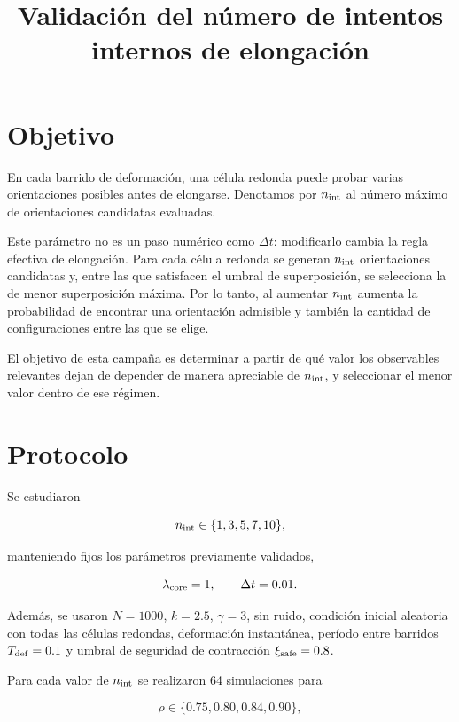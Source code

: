 \documentclass[11pt,a4paper]{article}
\title{Validación del número de intentos internos de elongación}
\author{}
\date{}
\begin{document}
\maketitle

\section{Objetivo}

En cada barrido de deformación, una célula redonda puede probar varias
orientaciones posibles antes de elongarse. Denotamos por \(n_{\rm int}\) al
número máximo de orientaciones candidatas evaluadas.

Este parámetro no es un paso numérico como \(\Delta t\): modificarlo cambia la
regla efectiva de elongación. Para cada célula redonda se generan
\(n_{\rm int}\) orientaciones candidatas y, entre las que satisfacen el umbral
de superposición, se selecciona la de menor superposición máxima. Por lo tanto,
al aumentar \(n_{\rm int}\) aumenta la probabilidad de encontrar una
orientación admisible y también la cantidad de configuraciones entre las que se
elige.

El objetivo de esta campaña es determinar a partir de qué valor los
observables relevantes dejan de depender de manera apreciable de
\(n_{\rm int}\), y seleccionar el menor valor dentro de ese régimen.

\section{Protocolo}

Se estudiaron

\begin{equation}
n_{\rm int}\in\{1,3,5,7,10\},
\end{equation}

manteniendo fijos los parámetros previamente validados,

\begin{equation}
\lambda_{\rm core}=1,
\qquad
\Delta t=0.01.
\end{equation}

Además, se usaron \(N=1000\), \(k=2.5\), \(\gamma=3\), sin ruido, condición
inicial aleatoria con todas las células redondas, deformación instantánea,
período entre barridos \(T_{\rm def}=0.1\) y umbral de seguridad de
contracción \(\xi_{\rm safe}=0.8\).

Para cada valor de \(n_{\rm int}\) se realizaron 64 simulaciones para

\begin{equation}
\rho\in\{0.75,0.80,0.84,0.90\},
\end{equation}
\end{document}
